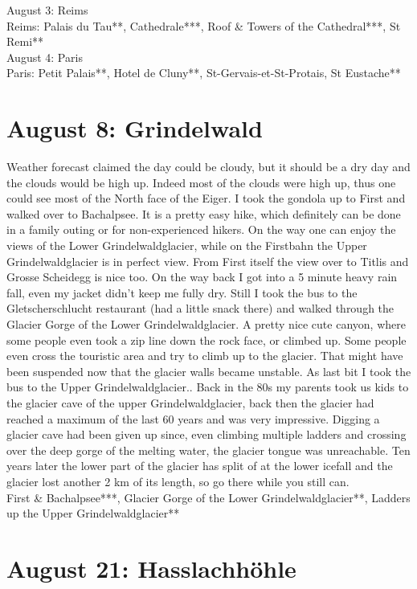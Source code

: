 August 3: Reims\\
Reims: Palais du Tau**, Cathedrale***, Roof \& Towers of the Cathedral***, St Remi**\\

August 4: Paris\\
Paris: Petit Palais**, Hotel de Cluny**, St-Gervais-et-St-Protais, St Eustache**

\section{August 8: Grindelwald}
\label{2010Grindelwald}

Weather forecast claimed the day could be cloudy, but it should be a dry day and the clouds would be high up. Indeed most of the clouds were high up, thus one could see most of the North face of the Eiger. I took the gondola up to First and walked over to Bachalpsee. It is a pretty easy hike, which definitely can be done in a family outing or for non-experienced hikers. On the way one can enjoy the views of the Lower Grindelwaldglacier, while on the Firstbahn the Upper Grindelwaldglacier is in perfect view. From First itself the view over to Titlis and Grosse Scheidegg is nice too. On the way back I got into a 5 minute heavy rain fall, even my jacket didn't keep me fully dry. Still I took the bus to the Gletscherschlucht restaurant (had a little snack there) and walked through the Glacier Gorge of the Lower Grindelwaldglacier. A pretty nice cute canyon, where some people even took a zip line down the rock face, or climbed up. Some people even cross the touristic area and try to climb up to the glacier. That might have been suspended now that the glacier walls became unstable. As last bit I took the bus to the Upper Grindelwaldglacier.. Back in the 80s my parents took us kids to the glacier cave of the upper Grindelwaldglacier, back then the glacier had reached a maximum of the last 60 years and was very impressive. Digging a glacier cave had been given up since, even climbing multiple ladders and crossing over the deep gorge of the melting water, the glacier tongue was unreachable. Ten years later the lower part of the glacier has split of at the lower icefall and the glacier lost another 2 km of its length, so go there while you still can.\\

First \& Bachalpsee***, Glacier Gorge of the Lower Grindelwaldglacier**, Ladders up the Upper Grindelwaldglacier**

\section{August 21: Hasslachh\"ohle}
\label{2010Hasslach}

